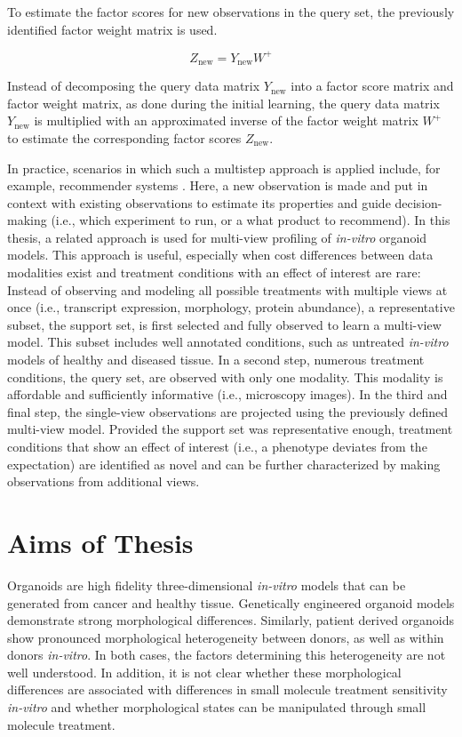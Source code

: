\begin{flushleft}
To estimate the factor scores for new observations in the query set, the previously identified factor weight matrix is used. 

\begin{equation}
    Z_{\text{new}} = Y_{\text{new}} W^+
\end{equation}

Instead of decomposing the query data matrix \(Y_{\text{new}}\) into a factor score matrix and factor weight matrix, as done during the initial learning, the query data matrix  \(Y_{\text{new}}\) is multiplied with an approximated inverse of the factor weight matrix \( W^+ \) to estimate the corresponding factor scores \( Z_{\text{new}} \).
\par

In practice, scenarios in which such a multistep approach is applied include, for example, recommender systems \parencite{korenMatrixFactorizationTechniques2009}. Here, a new observation is made and put in context with existing observations to estimate its properties and guide decision-making (i.e., which experiment to run, or a what product to recommend). In this thesis, a related approach is used for multi-view profiling of \textit{in-vitro} organoid models. This approach is useful, especially when cost differences between data modalities exist and treatment conditions with an effect of interest are rare: Instead of observing and modeling all possible treatments with multiple views at once (i.e., transcript expression, morphology, protein abundance), a representative subset, the support set, is first selected and fully observed to learn a multi-view model. This subset includes well annotated conditions, such as untreated \textit{in-vitro} models of healthy and diseased tissue. In a second step, numerous treatment conditions, the query set, are observed with only one modality. This modality is affordable and sufficiently informative (i.e., microscopy images). In the third and final step, the single-view observations are projected using the previously defined multi-view model. Provided the support set was representative enough, treatment conditions that show an effect of interest (i.e., a phenotype deviates from the expectation) are identified as novel and can be further characterized by making observations from additional views.

\newpage
\section{Aims of Thesis}
Organoids are high fidelity three-dimensional \textit{in-vitro} models that can be generated from cancer and healthy tissue. Genetically engineered organoid models demonstrate strong morphological differences. Similarly, patient derived organoids show pronounced morphological heterogeneity between donors, as well as within donors \textit{in-vitro}. In both cases, the factors determining this heterogeneity are not well understood. In addition, it is not clear whether these morphological differences are associated with differences in small molecule treatment sensitivity \textit{in-vitro} and whether morphological states can be manipulated through small molecule treatment.
\bigbreak


\end{flushleft}
